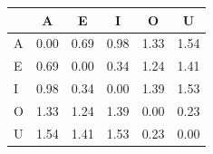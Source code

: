 \begin{tabular}{lccccc}
\toprule
\rowcolor{col01}
 & A & E & I & O & U \\
\midrule
A & 0.00 & 0.69 & 0.98 & 1.33 & 1.54 \\
E & 0.69 & 0.00 & 0.34 & 1.24 & 1.41 \\
I & 0.98 & 0.34 & 0.00 & 1.39 & 1.53 \\
O & 1.33 & 1.24 & 1.39 & 0.00 & 0.23 \\
U & 1.54 & 1.41 & 1.53 & 0.23 & 0.00 \\
\bottomrule
\end{tabular}
